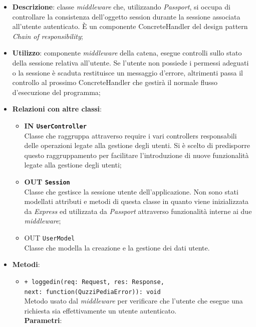 \begin{itemize}
	\item 
	\textbf{Descrizione}:
	classe \textit{middleware} che, utilizzando \textit{Passport}, si occupa di controllare la consistenza dell'oggetto session durante la sessione associata all'utente autenticato. È un componente ConcreteHandler del design pattern \textit{Chain of responsibility};
	\item
	\textbf{Utilizzo}:
	componente \textit{middleware} della catena, esegue controlli sullo stato della sessione relativa all'utente. Se l'utente non possiede i permessi adeguati o la sessione è scaduta restituisce un messaggio d'errore, altrimenti passa il controllo al prossimo ConcreteHandler che gestirà il normale flusso d'esecuzione del programma;
	\item
	\textbf{Relazioni con altre classi}:
	\begin{itemize}
		\item
		\textbf{IN \texttt{UserController}} \\
		Classe che raggruppa attraverso require i vari controllers responsabili delle operazioni legate alla gestione degli utenti. Si è scelto di predisporre questo raggruppamento per facilitare l'introduzione di nuove funzionalità legate alla gestione degli utenti;
		\item
		\textbf{OUT \texttt{Session}} \\
		Classe che gestisce la sessione utente dell'applicazione. Non sono stati modellati attributi e metodi di questa classe in quanto viene inizializzata da \textit{Express} ed utilizzata da \textit{Passport} attraverso funzionalità interne ai due \textit{middleware};
		\item
		OUT \texttt{UserModel} \\
		Classe che modella la creazione e la gestione dei dati utente.
	\end{itemize}
	\item
	\textbf{Metodi}:
	\begin{itemize}
		\item
		\texttt{+ loggedin(req: Request, res: Response, \\next: function(QuzziPediaError)): void} \\
		Metodo usato dal \textit{middleware} per verificare che l'utente che esegue una richiesta sia effettivamente un utente autenticato. \\
		\textbf{Parametri}:
		 \begin{itemize}

\end{itemize}
\end{itemize}
\end{itemize}
